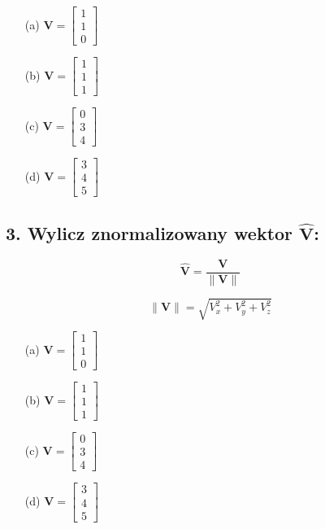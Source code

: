 \begin{enumerate}
    \item[(a)] $\mathbf{V} = \begin{bmatrix} 1 \\ 1 \\ 0 \end{bmatrix}$
    
    \item[(b)] $\mathbf{V} = \begin{bmatrix} 1 \\ 1 \\ 1 \end{bmatrix}$
    
    \item[(c)] $\mathbf{V} = \begin{bmatrix} 0 \\ 3 \\ 4 \end{bmatrix}$
    
    \item[(d)] $\mathbf{V} = \begin{bmatrix} 3 \\ 4 \\ 5 \end{bmatrix}$
\end{enumerate}

\subsection*{3. Wylicz znormalizowany wektor $\hat{\mathbf{V}}$:}

\[
\hat{\mathbf{V}} = \frac{\mathbf{V}}{\|\mathbf{V}\|} 
\]

\[
\|\mathbf{V}\| = \sqrt{V_x^2 + V_y^2 + V_z^2}
\]


\begin{enumerate}
    \item[(a)] $\mathbf{V} = \begin{bmatrix} 1 \\ 1 \\ 0 \end{bmatrix}$
    
    \item[(b)] $\mathbf{V} = \begin{bmatrix} 1 \\ 1 \\ 1 \end{bmatrix}$
    
    \item[(c)] $\mathbf{V} = \begin{bmatrix} 0 \\ 3 \\ 4 \end{bmatrix}$
    
    \item[(d)] $\mathbf{V} = \begin{bmatrix} 3 \\ 4 \\ 5 \end{bmatrix}$
\end{enumerate}

